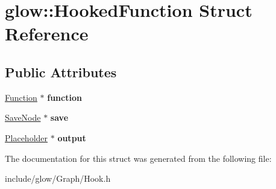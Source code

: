 \hypertarget{structglow_1_1_hooked_function}{}\section{glow\+:\+:Hooked\+Function Struct Reference}
\label{structglow_1_1_hooked_function}
\subsection*{Public Attributes}
\begin{DoxyCompactItemize}
\item 
\mbox{\label{structglow_1_1_hooked_function_a2a585ff35ab55bb403c19a62fd2a585f}} 
\hyperlink{classglow_1_1_function}{Function} $\ast$ {\bfseries function}
\item 
\mbox{\label{structglow_1_1_hooked_function_a215cfe50806dfbbbf79f986e31cc4225}} 
\hyperlink{classglow_1_1_save_node}{Save\+Node} $\ast$ {\bfseries save}
\item 
\mbox{\label{structglow_1_1_hooked_function_ad1731b15f04792d01b4697ddc022c092}} 
\hyperlink{classglow_1_1_placeholder}{Placeholder} $\ast$ {\bfseries output}
\end{DoxyCompactItemize}


The documentation for this struct was generated from the following file\+:\begin{DoxyCompactItemize}
\item 
include/glow/\+Graph/Hook.\+h\end{DoxyCompactItemize}
